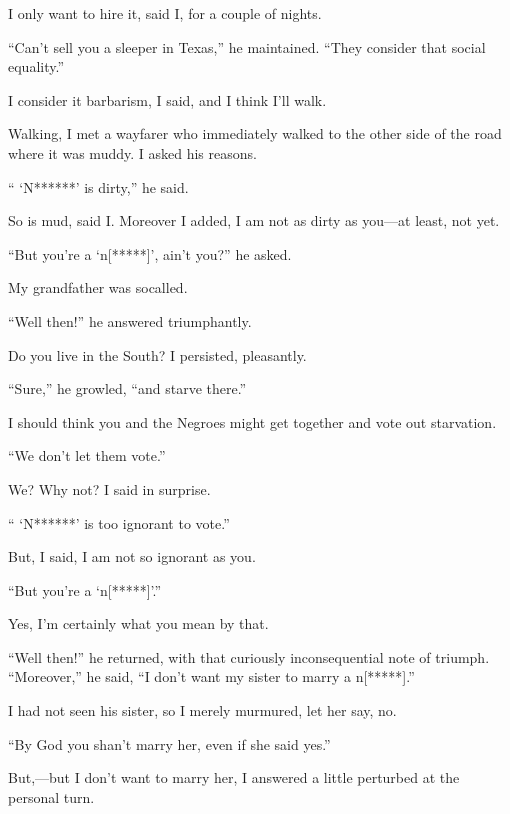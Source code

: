 \documentclass[letterpaper,10pt,english]{jupyterBook}
\begin{document}
\sphinxAtStartPar
I only want to hire it, said I, for a couple of nights.

\sphinxAtStartPar
“Can’t sell you a sleeper in Texas,” he maintained. “They consider that social equality.”

\sphinxAtStartPar
I consider it barbarism, I said, and I think I’ll walk.

\sphinxAtStartPar
Walking, I met a wayfarer who immediately walked to the other side of the road where it was muddy. I asked his reasons.

\sphinxAtStartPar
“ ‘N******’ is dirty,” he said.

\sphinxAtStartPar
So is mud, said I. Moreover I added, I am not as dirty as you—at least, not yet.

\sphinxAtStartPar
“But you’re a ‘n{[}*****{]}’, ain’t you?” he asked.

\sphinxAtStartPar
My grandfather was so\sphinxhyphen{}called.

\sphinxAtStartPar
“Well then!” he answered triumphantly.

\sphinxAtStartPar
Do you live in the South? I persisted, pleasantly.

\sphinxAtStartPar
“Sure,” he growled, “and starve there.”

\sphinxAtStartPar
I should think you and the Negroes might get together and vote out starvation.

\sphinxAtStartPar
“We don’t let them vote.”

\sphinxAtStartPar
We? Why not? I said in surprise.

\sphinxAtStartPar
“ `N******’ is too ignorant to vote.”

\sphinxAtStartPar
But, I said, I am not so ignorant as you.

\sphinxAtStartPar
“But you’re a ‘n{[}*****{]}’.”

\sphinxAtStartPar
Yes, I’m certainly what you mean by that.

\sphinxAtStartPar
“Well then!” he returned, with that curiously inconsequential note of triumph. “Moreover,” he said, “I don’t want my sister to marry a n{[}*****{]}.”

\sphinxAtStartPar
I had not seen his sister, so I merely murmured, let her say, no.

\sphinxAtStartPar
“By God you shan’t marry her, even if she said yes.”

\sphinxAtStartPar
But,—but I don’t want to marry her, I answered a little perturbed at the personal turn.
\end{document}
